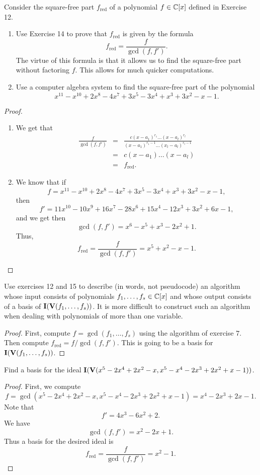 \begin{exercise}{15}
Consider the square-free part $f_{\text{red}}$ of a polynomial $f\in\mathbb{C}[x]$ defined in Exercise 12.
\begin{enumerate}
    \item Use Exercise 14 to prove that $f_{\text{red}}$ is given by the formula
    \[
    f_{\text{red}} =\frac{f}{\gcd(f,f')}.
    \]
    The virtue of this formula is that it allows us to find the square-free part without factoring $f$. This allows for much quicker computations.
    \item Use a computer algebra system to find the square-free part of the polynomial 
    \[
    x^{11}-x^{10}+2x^8-4x^7+3x^5-3x^4+x^3+3x^2-x-1.
    \]
\end{enumerate}
\end{exercise}
\begin{proof}
\begin{enumerate}
    \item We get that
    \begin{eqnarray*}
        \frac{f}{\gcd(f,f')}
        & = & \frac{c(x-a_1)^{r_1} \dots (x-a_l)^{r_l}}{(x-a_1)^{r_1 - 1} \dots (x_l - a_l)^{r_l - 1}}\\
        & = & c(x -a_1) \dots (x - a_l)\\
        & = & f_{\text{red}}.
    \end{eqnarray*}
    \item We know that if
    $$f = x^{11}-x^{10}+2x^8-4x^7+3x^5-3x^4+x^3+3x^2-x-1,$$
    then
    $$f' = 11x^{10} - 10x^9 + 16x^7 - 28x^6 + 15x^4 - 12x^3 + 3x^2 + 6x - 1,$$
    and we get then
    $$\gcd(f,f') = x^6 - x^5 + x^3 - 2x^2 + 1.$$
    Thus,
    $$f_{\text{red}} = \frac{f}{\gcd(f,f')} = x^5 + x^2 - x - 1.$$
\end{enumerate}
\end{proof}

\begin{exercise}{16}
Use exercises 12 and 15 to describe (in words, not pseudocode) an algorithm whose input consists of polynomials $f_1,\dots,f_s\in\mathbb{C}[x]$ and whose output consists of a basis of $\mathbf{I}(\mathbf{V}(f_1,\dots,f_s))$. It is more difficult to construct such an algorithm when dealing with polynomials of more than one variable.
\end{exercise}
\begin{proof}
First, compute $f = \gcd(f_1,\dots,f_s)$ using the algorithm of exercise $7$. Then compute $f_{\text{red}} = f/\gcd(f,f')$. This is going to be a basis for $\mathbf{I}(\mathbf{V}(f_1,\dots,f_s))$. 
\end{proof}

\begin{exercise}{17}
Find a basis for the ideal $\mathbf{I}(\mathbf{V}(x^5-2x^4+2x^2-x, x^5-x^4-2x^3+2x^2+x-1))$.
\end{exercise}
\begin{proof}
First, we compute
$$f = \gcd(x^5-2x^4+2x^2-x, x^5-x^4-2x^3+2x^2+x-1) = x^4 - 2x^3 + 2x - 1.$$
Note that
$$f' = 4x^3 - 6x^2 + 2.$$
We have
$$\gcd(f,f') = x^2 - 2x + 1.$$
Thus a basis for the desired ideal is
$$f_{\text{red}} = \frac{f}{\gcd(f,f')} = x^2 - 1.$$
\end{proof}
